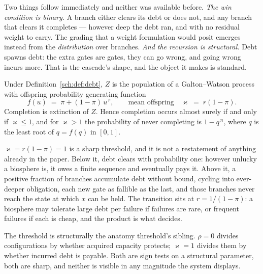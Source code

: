 Two things follow immediately and neither was available before. \emph{The win condition is binary.} A branch either clears its debt or
does not, and any branch that clears it completes --- however deep the
debt ran, and with no residual weight to carry. The grading that a
weight formulation would posit emerges instead from the
\emph{distribution} over branches. \emph{And the recursion is structural.} Debt spawns debt: the extra
gates are gates, they can go wrong, and going wrong incurs more. That is
the cascade's shape, and the object it makes is standard.

\begin{proposition}
\label{sch:prop:gw}
Under Definition~\ref{sch:def:debt}, $Z$ is the population of a
Galton--Watson process with offspring probability generating function
\begin{equation}\label{sch:eq:pgf}
f(u)\;=\;\pi+(1-\pi)\,u^{\,r},
\qquad\text{mean offspring}\quad \varkappa\;=\;r(1-\pi).
\end{equation}
Completion is extinction of $Z$. Hence completion occurs almost surely
if and only if $\varkappa\le1$, and for $\varkappa>1$ the probability of never
completing is $1-q^{\,n}$, where $q$ is the least root of $q=f(q)$ in
$[0,1]$.
\end{proposition}

\begin{remark}
\label{sch:rem:criticality}
$\varkappa=r(1-\pi)=1$ is a sharp threshold, and it is not a restatement of
anything already in the paper. Below it, debt clears with probability one: however unlucky a biosphere
is, it owes a finite sequence and eventually pays it. Above it, a
positive fraction of branches accumulate debt without bound, cycling
into ever-deeper obligation, each new gate as fallible as the last, and those branches never reach the state at which $x$ can be held. The
transition sits at $r=1/(1-\pi)$: a biosphere may tolerate large debt
per failure if failures are rare, or frequent failures if each is cheap,
and the product is what decides.

The threshold is structurally the anatomy threshold's sibling. $\rho=0$
divides configurations by whether acquired capacity protects; $\varkappa=1$
divides them by whether incurred debt is payable. Both are sign tests on
a structural parameter, both are sharp, and neither is visible in any
magnitude the system displays.
\end{remark}


